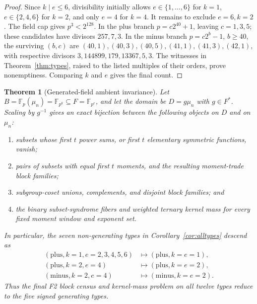 \documentclass[11pt,a4paper]{amsart}
\newtheorem{theorem}{Theorem}[section]
\theoremstyle{remark}
\newcommand{\F}{\mathbb F}
\begin{document}
\begin{proof}
Since \(k\mid e\le6\), divisibility initially allows
\(e\in\{1,\ldots,6\}\) for \(k=1\), \(e\in\{2,4,6\}\) for \(k=2\), and
only \(e=4\) for \(k=4\).  It remains to exclude \(e=6,k=2\).
The field cap gives \(p^3<2^{128}\).  In the plus branch
\(p=c2^{40}+1\), leaving \(c=1,3,5\); these candidates have divisors
\(257,7,3\).  In the minus branch \(p=c2^b-1\), \(b\ge40\), the surviving
\((b,c)\) are
\((40,1),(40,3),(40,5),(41,1),(41,3),(42,1)\), with respective divisors
\(3,144899,179,13367,5,3\).  The witnesses in
Theorem~\ref{thm:types}, raised to the listed multiples of their orders,
prove nonemptiness.  Comparing \(k\) and \(e\) gives the final count.
\end{proof}

\begin{theorem}[Generated-field ambient invariance]\label{thm:ambient}
Let \(B=\F_p(\mu_n)=\F_{p^k}\subseteq F=\F_{p^e}\), and let the domain be
\(D=g\mu_n\) with \(g\in F^*\).  Scaling by \(g^{-1}\) gives an exact
bijection between the following objects on \(D\) and on \(\mu_n\):
\begin{enumerate}
\item subsets whose first \(t\) power sums, or first \(t\) elementary
      symmetric functions, vanish;
\item pairs of subsets with equal first \(t\) moments, and the resulting
      moment-trade block families;
\item subgroup-coset unions, complements, and disjoint block families; and
\item the binary subset-syndrome fibers and weighted ternary kernel mass for
      every fixed moment window and exponent set.
\end{enumerate}
In particular, the seven non-generating types in
Corollary~\ref{cor:alltypes} descend as
\[
\begin{split}
 (\text{plus},k=1,e=2,3,4,5,6)&\longmapsto(\text{plus},k=e=1),\\
 (\text{plus},k=2,e=4)&\longmapsto(\text{plus},k=e=2),\\
 (\text{minus},k=2,e=4)&\longmapsto(\text{minus},k=e=2).
\end{split}
\]
Thus the final F2 block census and kernel-mass problem on all twelve types
reduce to the five signed generating types.
\end{theorem}
\end{document}
